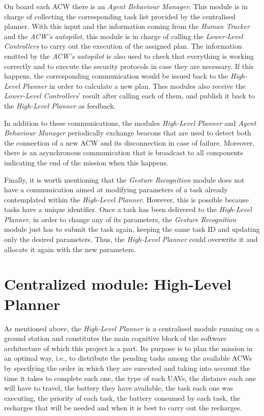 On board each \gls{ACW} there is an \emph{Agent Behaviour Manager}. This module is in charge of collecting the corresponding task list provided by the centralised planner. With this input and the information coming from the \emph{Human Tracker} and the \emph{\gls{ACW}'s autopilot}, this module is in charge of calling the \emph{Lower-Level Controllers} to carry out the execution of the assigned plan. The information emitted by the \emph{\gls{ACW}'s autopilot} is also used to check that everything is working correctly and to execute the security protocols in case they are necessary. If this happens, the corresponding communication would be issued back to the \emph{High-Level Planner} in order to calculate a new plan. Thes modules also receive the \emph{Lower-Level Controllers}' result after calling each of them, and publish it back to the \emph{High-Level Planner} as feedback.

In addition to these communications, the modules \emph{High-Level Planner} and \emph{Agent Behaviour Manager} periodically exchange beacons that are used to detect both the connection of a new \gls{ACW} and its disconnection in case of failure. Moreover, there is an asynchronous communication that is broadcast to all components indicating the end of the mission when this happens.

Finally, it is worth mentioning that the \emph{Gesture Recognition} module does not have a communication aimed at modifying parameters of a task already contemplated within the \emph{High-Level Planner}. However, this is possible because tasks have a unique identifier. Once a task has been delivered to the \emph{High-Level Planner}, in order to change any of its parameters, the \emph{Gesture Recognition} module just has to submit the task again, keeping the same task \gls{ID} and updating only the desired parameters. Thus, the \emph{High-Level Planner} could overwrite it and allocate it again with the new parameters.

\section{Centralized module: High-Level Planner}
\label{sec:Centralized module:TaskPlanner}
As mentioned above, the \emph{High-Level Planner} is a centralised module running on a ground station and constitutes the main cognitive block of the software architecture of which this project is a part. Its purpose is to plan the mission in an optimal way, i.e., to distribute the pending tasks among the available \glspl{ACW} by specifying the order in which they are executed and taking into account the time it takes to complete each one, the type of each \glspl{UAV}, the distance each one will have to travel, the battery they have available, the task each one was executing, the priority of each task, the battery consumed by each task, the recharges that will be needed and when it is best to carry out the recharges.

